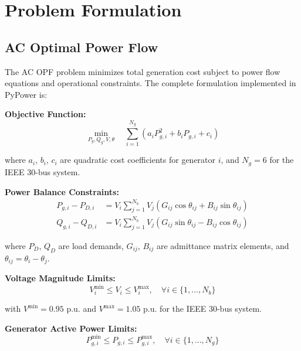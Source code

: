 \documentclass[journal,12pt,onecolumn]{IEEEtran}
\begin{document}
\section{Problem Formulation}
\label{sec:problem}

\subsection{AC Optimal Power Flow}

The AC OPF problem minimizes total generation cost subject to power flow equations and operational constraints. The complete formulation implemented in PyPower is:

\textbf{Objective Function:}
\begin{equation}
\min_{P_g, Q_g, V, \theta} \quad \sum_{i=1}^{N_g} \left( a_i P_{g,i}^2 + b_i P_{g,i} + c_i \right)
\label{eq:opf_obj}
\end{equation}

where $a_i$, $b_i$, $c_i$ are quadratic cost coefficients for generator $i$, and $N_g = 6$ for the IEEE 30-bus system.

\textbf{Power Balance Constraints:}
\begin{align}
P_{g,i} - P_{D,i} &= V_i \sum_{j=1}^{N_b} V_j \left( G_{ij} \cos\theta_{ij} + B_{ij} \sin\theta_{ij} \right) \label{eq:pbalance}\\
Q_{g,i} - Q_{D,i} &= V_i \sum_{j=1}^{N_b} V_j \left( G_{ij} \sin\theta_{ij} - B_{ij} \cos\theta_{ij} \right) \label{eq:qbalance}
\end{align}

where $P_D$, $Q_D$ are load demands, $G_{ij}$, $B_{ij}$ are admittance matrix elements, and $\theta_{ij} = \theta_i - \theta_j$.

\textbf{Voltage Magnitude Limits:}
\begin{equation}
V_i^{\min} \leq V_i \leq V_i^{\max}, \quad \forall i \in \{1, \ldots, N_b\}
\label{eq:vlim}
\end{equation}

with $V^{\min} = 0.95$ p.u. and $V^{\max} = 1.05$ p.u. for the IEEE 30-bus system.

\textbf{Generator Active Power Limits:}
\begin{equation}
P_{g,i}^{\min} \leq P_{g,i} \leq P_{g,i}^{\max}, \quad \forall i \in \{1, \ldots, N_g\}
\label{eq:pglim}
\end{equation}
\end{document}
